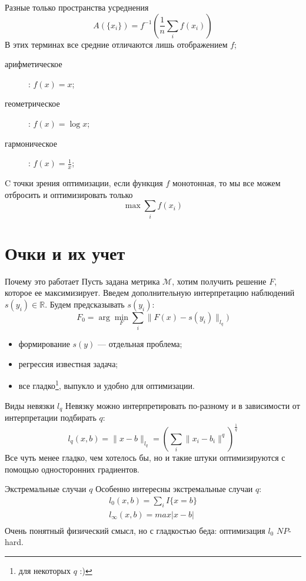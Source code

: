 \documentclass[14pt, fleqn, xcolor={dvipsnames, table}]{beamer}
\begin{document}
\begin{frame}{Разные только пространства усреднения}
$$
A(\{x_i\}) = f^{-1}\left(\frac{1}{n} \sum_i f(x_i)\right)
$$
В этих терминах все средние отличаются лишь отображением $f$;
\begin{description}
  \item[арифметическое]: $f(x) = x$; 
  \item[геометрическое]: $f(x) = \log x$; 
  \item[гармоническое]: $f(x) = \frac{1}{x}$; 
\end{description}
C точки зрения оптимизации, если функция $f$ монотонная, то мы все можем отбросить и оптимизировать только
$$
\max \sum_i f(x_i)
$$
\end{frame}

\section{Очки и их учет}

\begin{frame}{Почему это работает}
Пусть задана метрика $\mathcal{M}$, хотим получить решение $F$, которое ее максимизирует. Введем дополнительную интерпретацию наблюдений $s(y_i) \in \mathbb{R}$. Будем предсказывать $s(y_i)$:
$$
F_0 = \arg\min_F \sum_i \|F(x) - s(y_i)\|_{l_q})
$$
\begin{itemize}
  \item формирование $s(y)$ --- отдельная проблема;
  \item регрессия известная задача;
  \item все гладко\footnote{для некоторых $q$ :)}, выпукло и удобно для оптимизации.
\end{itemize}
\end{frame}

\begin{frame}{Виды невязки $l_q$}
Невязку можно интерпретировать по-разному и в зависимости от интерпретации подбирать $q$:
$$
l_q(x,b) = \|x - b\|_{l_q} = \left(\sum_i\|x_i - b_i\|^q\right)^\frac{1}{q}
$$
Все чуть менее гладко, чем хотелось бы, но и такие штуки оптимизируются с помощью односторонних градиентов.
\end{frame}

\begin{frame}{Экстремальные случаи $q$}
Особенно интересны экстремальные случаи $q$:
$$\begin{array}{l}
l_0(x,b) = \sum_i I\{x = b\} \\
l_{\infty}(x,b) = max |x - b| \\
\end{array}$$
Очень понятный физический смысл, но с гладкостью беда: оптимизация $l_0$ $NP$-hard.
\end{frame}
\end{document}
